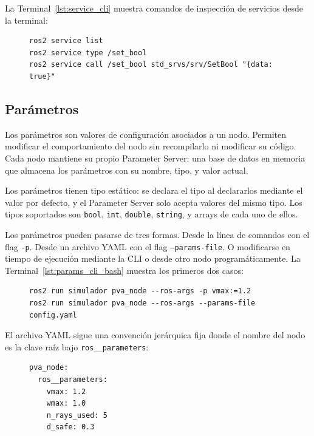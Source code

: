 La Terminal~\ref{lst:service_cli} muestra comandos de inspección de servicios desde la terminal:

\begin{figure}[H]
\centering
\begin{lstlisting}[style=bash, caption={Inspección de servicios desde la terminal.}, label={lst:service_cli}]
ros2 service list
ros2 service type /set_bool
ros2 service call /set_bool std_srvs/srv/SetBool "{data: true}"
\end{lstlisting}
\end{figure}

\subsection{Parámetros}

Los parámetros son valores de configuración asociados a un nodo. Permiten modificar el comportamiento del nodo sin recompilarlo ni modificar su código. Cada nodo mantiene su propio Parameter Server: una base de datos en memoria que almacena los parámetros con su nombre, tipo, y valor actual.

Los parámetros tienen tipo estático: se declara el tipo al declararlos mediante el valor por defecto, y el Parameter Server solo acepta valores del mismo tipo. Los tipos soportados son \texttt{bool}, \texttt{int}, \texttt{double}, \texttt{string}, y arrays de cada uno de ellos.

Los parámetros pueden pasarse de tres formas. Desde la línea de comandos con el flag \texttt{-p}. Desde un archivo YAML con el flag \texttt{--params-file}. O modificarse en tiempo de ejecución mediante la CLI o desde otro nodo programáticamente. La Terminal~\ref{lst:params_cli_bash} muestra los primeros dos casos:

\begin{figure}[H]
\centering
\begin{lstlisting}[style=bash, caption={Paso de parámetros desde la línea de comandos y desde archivo YAML.}, label={lst:params_cli_bash}]
ros2 run simulador pva_node --ros-args -p vmax:=1.2
ros2 run simulador pva_node --ros-args --params-file config.yaml
\end{lstlisting}
\end{figure}

El archivo YAML sigue una convención jerárquica fija donde el nombre del nodo es la clave raíz bajo \texttt{ros\_\_parameters}:

\begin{figure}[H]
\centering
\begin{lstlisting}[style=bash, caption={Estructura de un archivo de parámetros YAML.}, label={lst:params_yaml}]
pva_node:
  ros__parameters:
    vmax: 1.2
    wmax: 1.0
    n_rays_used: 5
    d_safe: 0.3
\end{lstlisting}
\end{figure}

